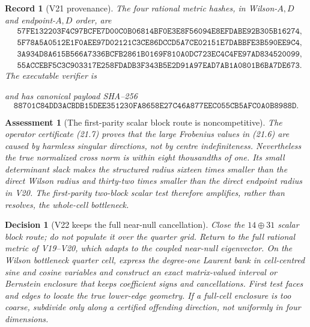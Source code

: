 \documentclass[11pt,oneside]{article}
\newtheorem{assessment}[theorem]{Assessment}
\newtheorem{record}[theorem]{Record}
\newtheorem{decision}[theorem]{Decision}
\theoremstyle{definition}
\theoremstyle{remark}
\begin{document}
\begin{record}[V21 provenance]
\label{rec:newv21-provenance}
The four rational metric hashes, in Wilson-\(A,D\) and endpoint-\(A,D\)
order, are
\[
\begin{aligned}
&\texttt{57FE132203F4C97BCFE7D00C0B06814BF0E3E8F56094E8EFDABE92B305B16274},\\
&\texttt{5F78A5A0512E1F0AEE97D02121C3CE86DCCD5A7CE02151E7DABBFE3B590EE9C4},\\
&\texttt{3A934D8A615B566A7336BCFB2861B0169F810A0DC723EC4C4FE97AD834520099},\\
&\texttt{55ACCEBF5C3C903317E258FDADB3F343B5E2D91A97EAD7AB1A0801B6BA7DE673}.
\end{aligned}                                            \tag{21.17}
\]
The executable verifier is
\begin{center}
\footnotesize
{}
\end{center}
and has canonical payload SHA--256
\[
\texttt{88701C84DD3ACBDB15DEE351230FA8658E27C46A877EEC055CB5AFC0A0B8988D}.
                                                               \tag{21.18}
\]
\end{record}

\begin{assessment}[The first-parity scalar block route is noncompetitive]
\label{ass:newv21}
The operator certificate (21.7) proves that the large Frobenius
values in (21.6) are caused by harmless singular directions, not by
centre indefiniteness.  Nevertheless the true normalized cross norm
is within eight thousandths of one.  Its small determinant slack
makes the structured radius sixteen times smaller than the direct
Wilson radius and thirty-two times smaller than the direct endpoint
radius in V20.  The first-parity two-block scalar test therefore
amplifies, rather than resolves, the whole-cell bottleneck.
\end{assessment}

\begin{decision}[V22 keeps the full near-null cancellation]
\label{dec:newv21-next}
Close the \(14\oplus31\) scalar block route; do not populate it over
the quarter grid.  Return to the full rational metric of V19--V20,
which adapts to the coupled near-null eigenvector.  On the Wilson
bottleneck quarter cell, express the degree-one Laurent bank in
cell-centred sine and cosine variables and construct an exact
matrix-valued interval or Bernstein enclosure that keeps
coefficient signs and cancellations.  First test faces and edges to
locate the true lower-edge geometry.  If a full-cell enclosure is
too coarse, subdivide only along a certified offending direction,
not uniformly in four dimensions.
\end{decision}
\end{document}
